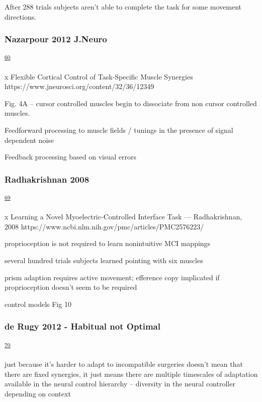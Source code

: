 \documentclass[
  a4paper,
]{article}
\begin{document}
After 288 trials subjects aren't able to complete the task for some
movement directions.

\hypertarget{nazarpour-2012-j.neuro}{%
\subsubsection{Nazarpour 2012 J.Neuro}\label{nazarpour-2012-j.neuro}}

\textsuperscript{\protect\hyperlink{ref-nazarpourFlexibleCorticalControl2012}{60}}

x Flexible Cortical Control of Task-Specific Muscle Synergies
https://www.jneurosci.org/content/32/36/12349

Fig. 4A -- cursor controlled muscles begin to dissociate from non cursor
controlled muscles.

Feedforward processing to muscle fields / tunings in the presence of
signal dependent noise

Feedback processing based on visual errors

\hypertarget{radhakrishnan-2008}{%
\subsubsection{Radhakrishnan 2008}\label{radhakrishnan-2008}}

\textsuperscript{\protect\hyperlink{ref-radhakrishnanLearningNovelMyoelectricControlled2008}{69}}

x Learning a Novel Myoelectric-Controlled Interface Task ---
Radhakrishnan, 2008
https://www.ncbi.nlm.nih.gov/pmc/articles/PMC2576223/

proprioception is not required to learn nonintuitive MCI mappings

several hundred trials subjects learned pointing with six muscles

prism adaption requires active movement; efference copy implicated if
proprioception doesn't seem to be required

control models Fig 10

\hypertarget{de-rugy-2012---habitual-not-optimal}{%
\subsubsection{de Rugy 2012 - Habitual not
Optimal}\label{de-rugy-2012---habitual-not-optimal}}

\textsuperscript{\protect\hyperlink{ref-derugyMuscleCoordinationHabitual2012}{70}}

just because it's harder to adapt to incompatible surgeries doesn't mean
that there are fixed synergies, it just means there are multiple
timescales of adaptation available in the neural control hierarchy --
diversity in the neural controller depending on context
\end{document}

